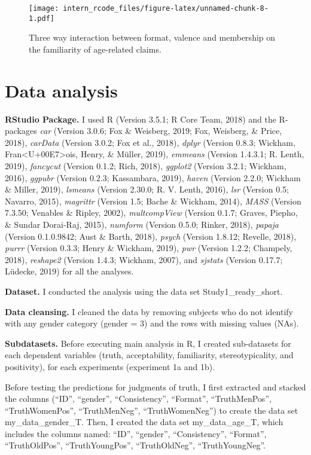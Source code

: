 \documentclass[man]{apa6}
\begin{document}
\begin{figure}
\centering
\texttt{[image: intern\_rcode\_files/figure-latex/unnamed-chunk-8-1.pdf]}
\caption{\label{fig:unnamed-chunk-8}Three way interaction between format,
valence and membership on the familiarity of age-related claims.}
\end{figure}

\section{Data analysis}\label{data-analysis}

\textbf{RStudio Package.} I used R (Version 3.5.1; R Core Team, 2018)
and the R-packages \emph{car} (Version 3.0.6; Fox \& Weisberg, 2019;
Fox, Weisberg, \& Price, 2018), \emph{carData} (Version 3.0.2; Fox et
al., 2018), \emph{dplyr} (Version 0.8.3; Wickham,
Fran\textless{}U+00E7\textgreater{}ois, Henry, \& Müller, 2019),
\emph{emmeans} (Version 1.4.3.1; R. Lenth, 2019), \emph{fancycut}
(Version 0.1.2; Rich, 2018), \emph{ggplot2} (Version 3.2.1; Wickham,
2016), \emph{ggpubr} (Version 0.2.3; Kassambara, 2019), \emph{haven}
(Version 2.2.0; Wickham \& Miller, 2019), \emph{lsmeans} (Version
2.30.0; R. V. Lenth, 2016), \emph{lsr} (Version 0.5; Navarro, 2015),
\emph{magrittr} (Version 1.5; Bache \& Wickham, 2014), \emph{MASS}
(Version 7.3.50; Venables \& Ripley, 2002), \emph{multcompView} (Version
0.1.7; Graves, Piepho, \& Sundar Dorai-Raj, 2015), \emph{numform}
(Version 0.5.0; Rinker, 2018), \emph{papaja} (Version 0.1.0.9842; Aust
\& Barth, 2018), \emph{psych} (Version 1.8.12; Revelle, 2018),
\emph{purrr} (Version 0.3.3; Henry \& Wickham, 2019), \emph{pwr}
(Version 1.2.2; Champely, 2018), \emph{reshape2} (Version 1.4.3;
Wickham, 2007), and \emph{sjstats} (Version 0.17.7; Lüdecke, 2019) for
all the analyses.

\textbf{Dataset.} I conducted the analysis using the data set
Study1\_ready\_short.

\textbf{Data cleansing.} I cleaned the data by removing subjects who do
not identify with any gender category (gender = 3) and the rows with
missing values (NAs).

\textbf{Subdatasets.} Before executing main analysis in R, I created
sub-datasets for each dependent variables (truth, acceptability,
familiarity, stereotypicality, and positivity), for each experiments
(experiment 1a and 1b).

Before testing the predictions for judgments of truth, I first extracted
and stacked the columns (\enquote{ID}, \enquote{gender},
\enquote{Consistency}, \enquote{Format}, \enquote{TruthMenPos},
\enquote{TruthWomenPos}, \enquote{TruthMenNeg}, \enquote{TruthWomenNeg})
to create the data set my\_data\_gender\_T. Then, I created the data set
my\_data\_age\_T, which includes the columns named: \enquote{ID},
\enquote{gender}, \enquote{Consistency}, \enquote{Format},
\enquote{TruthOldPos}, \enquote{TruthYoungPos}, \enquote{TruthOldNeg},
\enquote{TruthYoungNeg}.
\end{document}
